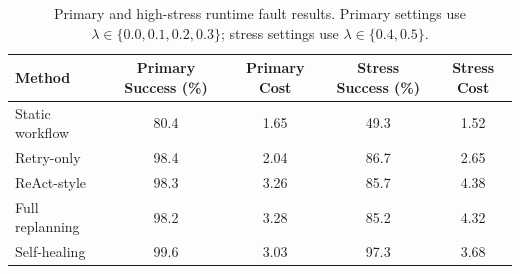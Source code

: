 \begin{table}[H]
\centering
\caption{Primary and high-stress runtime fault results. Primary settings use $\lambda \in \{0.0,0.1,0.2,0.3\}$; stress settings use $\lambda \in \{0.4,0.5\}$.}
\label{tab:primary_stress_results}
\small
\setlength{\tabcolsep}{6pt}
\begin{tabular}{lcccc}
\toprule
\textbf{Method} & \textbf{Primary Success (\%)} & \textbf{Primary Cost} & \textbf{Stress Success (\%)} & \textbf{Stress Cost} \\
\midrule
Static workflow & 80.4 & 1.65 & 49.3 & 1.52 \\
Retry-only & 98.4 & 2.04 & 86.7 & 2.65 \\
ReAct-style & 98.3 & 3.26 & 85.7 & 4.38 \\
Full replanning & 98.2 & 3.28 & 85.2 & 4.32 \\
Self-healing & 99.6 & 3.03 & 97.3 & 3.68 \\
\bottomrule
\end{tabular}
\end{table}
